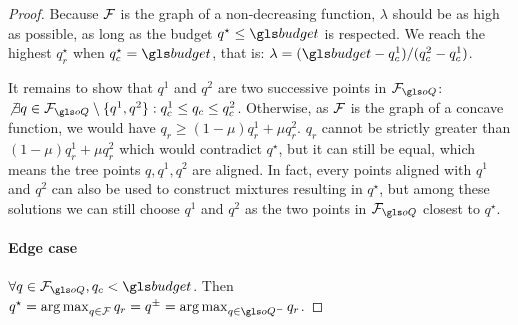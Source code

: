 \begin{subappendices}
\begin{proof}
    Because $\mathcal{F}$ is the graph of a non-decreasing function, $\lambda$ should be as high as possible, as long as the budget $q^{\star}\leq\budget$ is respected. We reach the highest $q_r^{\star}$ when $q^{\star}_c=\budget$, that is: $\lambda=(\budget-q_c^1)/(q_c^2-q_c^1)$.

    It remains to show that $q^1$ and $q^2$ are two successive points in $\cF_{\oQ}$: $\not\exists q\in\cF_{\oQ}\setminus\{q^1, q^2\}: q^1_c \leq q_c \leq q^2_c$. Otherwise, as $\mathcal{F}$ is the graph of a concave function, we would have $q_r \geq (1-\mu)q_r^1 + \mu q_r^2$. $q_r$ cannot be strictly greater than $(1-\mu)q_r^1 + \mu q_r^2$ which would contradict $q^{\star}$, but it can still be equal, which means the tree points $q, q^1, q^2$ are aligned. In fact, every points aligned with $q^1$ and $q^2$ can also be used to construct mixtures resulting in $q^{\star}$, but among these solutions we can still choose $q^1$ and $q^2$ as the two points in $\cF_{\oQ}$ closest to $q^{\star}$.

    \paragraph{Edge case}

    $\forall q\in\cF_{\oQ}, q_c < \budget$. Then  $q^{\star} =  \argmax_{q\in\cF} q_r = q^\pm =  \argmax_{q\in \oQ^-} q_r$.
\end{proof}







\end{subappendices}
